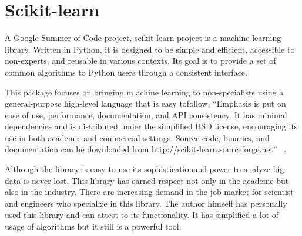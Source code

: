 \section{Scikit-learn}

A Google Summer of Code project, scikit-learn project is a
machine-learning library.  Written in Python, it is designed to be
simple and efficient, accessible to non-experts, and reusable in
various contexts. Its goal is to provide a set of common algorithms to
Python users through a consistent interface.

This package focuses on bringing m achine learning to non-specialists
using a general-purpose high-level language that is easy tofollow.
``Emphasis is put on ease of use, performance, documentation, and API
consistency.  It has minimal dependencies and is distributed under the
simplified BSD license, encouraging its use in both academic and
commercial settings. Source code, binaries, and documentation can be
downloaded from http://scikit-learn.sourceforge.net''
~\cite{hid-sp18-506-Scikit-learn}.

	
Although the library is easy to use its sophisticationand power to
analyze big data is never lost. This library has earned respect not
only in the academe but also in the industry. There are increasing
demand in the job market for scientist and engineers who specialize in
this library. The author himself has personally used this library and
can attest to its functionality. It has simplified a lot of usage of
algorithms but it still is a powerful tool.
